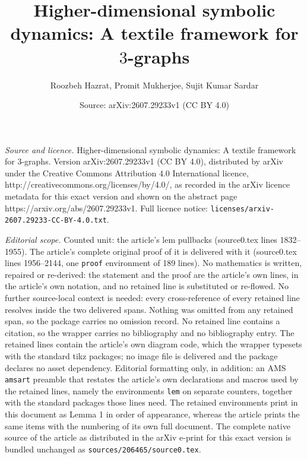 \documentclass[10pt,a4paper]{amsart}
\title{Higher-dimensional symbolic dynamics: A textile framework for $3$-graphs}
\author{Roozbeh Hazrat, Promit Mukherjee, Sujit Kumar Sardar}
\date{Source: arXiv:2607.29233v1 (CC BY 4.0)}
\begin{document}
\maketitle

\noindent\emph{Source and licence.} Higher-dimensional symbolic dynamics: A textile framework for $3$-graphs. Version arXiv:2607.29233v1 (CC BY 4.0), distributed by arXiv under the Creative Commons Attribution 4.0 International licence, http://creativecommons.org/licenses/by/4.0/, as recorded in the arXiv licence metadata for this exact version and shown on the abstract page https://arxiv.org/abs/2607.29233v1. Full licence notice: \texttt{licenses/arxiv-2607.29233-CC-BY-4.0.txt}.\par\smallskip

\noindent\textit{Editorial scope.} Counted unit: the article's lem pullbacks (source0.tex lines 1832--1955). The article's complete original proof of it is delivered with it (source0.tex lines 1956--2144, one \texttt{proof} environment of 189 lines). No mathematics is written, repaired or re-derived: the statement and the proof are the article's own lines, in the article's own notation, and no retained line is substituted or re-flowed.  No further source-local context is needed: every cross-reference of every retained line resolves inside the two delivered spans.  Nothing was omitted from any retained span, so the package carries no omission record.  No retained line contains a citation, so the wrapper carries no bibliography and no bibliography entry.  The retained lines contain the article's own diagram code, which the wrapper typesets with the standard tikz packages; no image file is delivered and the package declares no asset dependency.  Editorial formatting only, in addition: an AMS \texttt{amsart} preamble that restates the article's own declarations and macros used by the retained lines, namely the environments \texttt{lem} on separate counters, together with the standard packages those lines need.  The retained environments print in this document as Lemma 1 in order of appearance, whereas the article prints the same items with the numbering of its own full document.  The complete native source of the article as distributed in the arXiv e-print for this exact version is bundled unchanged as \texttt{sources/206465/source0.tex}.
\end{document}
